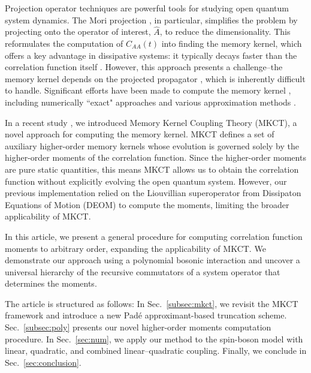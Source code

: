\documentclass[preprint,aip,jcp]{revtex4-2}
\begin{document}
Projection operator techniques \cite{Nakajima1958projection, zwanzig1960projection, Zwanzig1961projection, mori1965projection} are powerful tools for studying open quantum system dynamics. The Mori projection \cite{mori1965projection}, in particular, simplifies the problem by projecting onto the operator of interest, $\hat{A}$, to reduce the dimensionality. This reformulates the computation of $C_{AA}(t)$ into finding the memory kernel, which offers a key advantage in dissipative systems: it typically decays faster than the correlation function itself \cite{Cohen2011exact_kernel, Dan2022kernel_faster}. However, this approach presents a challenge--the memory kernel depends on the projected propagator \cite{montoya-castillo_approximate_2016}, which is inherently difficult to handle. Significant efforts have been made to compute the memory kernel \cite{Mulvihill2021kernels_rev}, including numerically ``exact" approaches \cite{shi2003memker, Cohen2011exact_kernel, zhang2016deomkernel, Ivander2024unified} and various approximation methods \cite{shi2004semiclassical, kelly_generalized_2016, montoya-castillo_approximate_2016, montoya-castillo_approximate_2017, Bhattacharyya2024mori}.

In a recent study \cite{liu2024mkct}, we introduced Memory Kernel Coupling Theory (MKCT), a novel approach for computing the memory kernel. MKCT defines a set of auxiliary higher-order memory kernels whose evolution is governed solely by the higher-order moments of the correlation function. Since the higher-order moments are pure static quantities, this means MKCT allows us to obtain the correlation function without explicitly evolving the open quantum system. However, our previous implementation relied on the Liouvillian superoperator from Dissipaton Equations of Motion (DEOM) \cite{wang2022DEOM} to compute the moments, limiting the broader applicability of MKCT.

In this article, we present a general procedure for computing correlation function moments to arbitrary order, expanding the applicability of MKCT. We demonstrate our approach using a polynomial bosonic interaction and uncover a universal hierarchy of the recursive commutators of a system operator that determines the moments.

The article is structured as follows: In Sec.~\ref{subsec:mkct}, we revisit the MKCT framework and introduce a new Pad\'{e} approximant-based truncation scheme. Sec.~\ref{subsec:poly} presents our novel higher-order moments computation procedure. In Sec.~\ref{sec:num}, we apply our method to the spin-boson model with linear, quadratic, and combined linear–quadratic coupling. Finally, we conclude in Sec.~\ref{sec:conclusion}.
\end{document}
